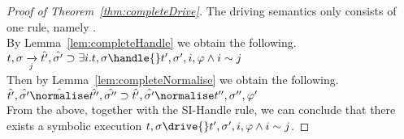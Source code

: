 \begin{proof}[Proof of Theorem~\ref{thm:completeDrive}]
  The driving semantics only consists of one rule, namely .\\
  By Lemma~\ref{lem:completeHandle} we obtain the following.\\
  $t,\sigma\xrightarrow[j]{}\hat{t'},\hat{\sigma'}\implies \exists i . t,\sigma\handle{}t',\sigma',i,\phi \land i\sim j$\\
  Then by Lemma~\ref{lem:completeNormalise} we obtain the following.\\
  $\hat{t'},\hat{\sigma'}\hat{\normalise}\hat{t''},\hat{\sigma''}\implies \hat{t'},\hat{\sigma'}\normalise t'',\sigma'',\phi'$\\
  From the above, together with the SI-Handle rule, we can conclude that there exists a symbolic execution $t,\sigma\drive{} t',\sigma',i,\phi\land i\sim j$.

\end{proof}
